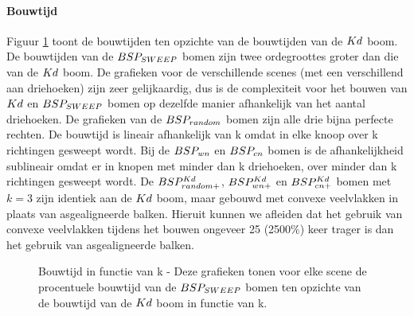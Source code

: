 \paragraph{Bouwtijd} Figuur \ref{fig:k-bouwtijd} toont de bouwtijden ten opzichte van de bouwtijden van de $Kd$ boom. De bouwtijden van de $BSP_{SWEEP}$ bomen zijn twee ordegroottes groter dan die van de $Kd$ boom. De grafieken voor de verschillende scenes (met een verschillend aan driehoeken) zijn zeer gelijkaardig, dus is de complexiteit voor het bouwen van $Kd$ en $BSP_{SWEEP}$ bomen op dezelfde manier afhankelijk van het aantal driehoeken. De grafieken van de $BSP_{random}$ bomen zijn alle drie bijna perfecte rechten. De bouwtijd is lineair afhankelijk van k omdat in elke knoop over k richtingen gesweept wordt. Bij de $BSP_{wn}$ en $BSP_{cn}$ bomen is de afhankelijkheid sublineair omdat er in knopen met minder dan k driehoeken, over minder dan k richtingen gesweept wordt. 
De $BSP^{Kd}_{random+}$, $BSP^{Kd}_{wn+}$ en $BSP^{Kd}_{cn+}$ bomen met $k = 3$ zijn identiek aan de $Kd$ boom, maar gebouwd met convexe veelvlakken in plaats van asgealigneerde balken.
Hieruit kunnen we afleiden dat het gebruik van convexe veelvlakken tijdens het bouwen ongeveer 25 (2500\%) keer trager is dan het gebruik van asgealigneerde balken.
\begin{figure}[h]
  \centering
  \begin{subfigure}[t]{.32\linewidth}
    \centering
{}
  \end{subfigure}
  \begin{subfigure}[t]{.32\linewidth}
    \centering
{}
\end{subfigure}
\begin{subfigure}[t]{.32\linewidth}
  \centering
{}
\end{subfigure}
\caption[Bouwtijd in functie van k]{Bouwtijd in functie van k - \small Deze grafieken tonen voor elke scene de procentuele bouwtijd van de $BSP_{SWEEP}$ bomen ten opzichte van de bouwtijd van de $Kd$ boom in functie van k.}
\label{fig:k-bouwtijd}
\end{figure}


